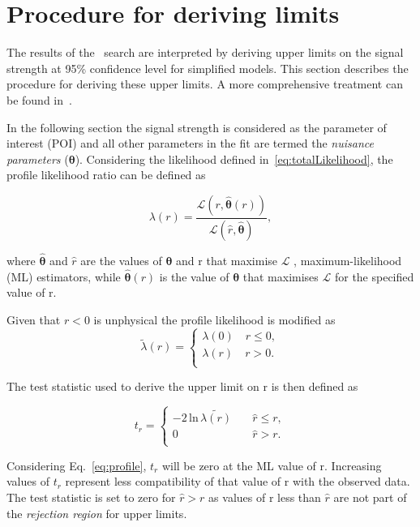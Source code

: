 \section{Procedure for deriving limits}
\label{sec:limits}
The results of the \alphat~search are interpreted by deriving upper limits on the signal strength
at 95\% confidence level for simplified models. This section describes the procedure for deriving
these upper limits. A more comprehensive treatment can be found in~\cite{asymp}.

In the following section the signal strength is considered as the parameter of interest (POI)
and all other parameters in the fit are termed the \emph{nuisance parameters} ($\boldsymbol{\theta}$). Considering
the likelihood defined in~\ref{eq:totalLikelihood}, the profile likelihood ratio can be defined as

\begin{equation}
\label{eq:profile}
\lambda(r) = \frac{\mathcal{L}(r,\hat{\boldsymbol{\theta}}(r))}{\mathcal{L}(\hat{r},\hat{\boldsymbol{\theta}})},
\end{equation}

where $\hat{\boldsymbol{\theta}}$ and $\hat{r}$ are the values of $\boldsymbol{\theta}$ and r that maximise $\mathcal{L}$
, maximum-likelihood (ML) estimators, while $\hat{\boldsymbol{\theta}}(r)$ is the value
of $\boldsymbol{\theta}$ that maximises $\mathcal{L}$ for the specified value of r. 

Given that $r < 0$ is unphysical the profile likelihood is modified as
\begin{equation}
\label{eq:profileNew}
\tilde{\lambda}(r) = 
\begin{cases}
\lambda(0)\quad r \le 0, \\ 
\lambda(r)\quad r > 0. \\ 
\end{cases}
\end{equation}

The test statistic used to derive the upper limit on r is then defined as

\begin{equation}
t_r = 
\begin{cases}
-2\,\text{ln}\,\tilde{\lambda(r)}\quad &\hat{r} \le r, \\ 
0 \quad &\hat{r} > r. \\ 
\end{cases}
\end{equation}

Considering Eq.~\ref{eq:profile}, $t_r$ will be zero at the ML value of r.
Increasing values of $t_r$ represent less compatibility of that value of r with
the observed data. The test statistic is set to zero for $\hat{r} > r$ as
values of r less than $\hat{r}$ are not part of the \emph{rejection region} for upper limits. 

